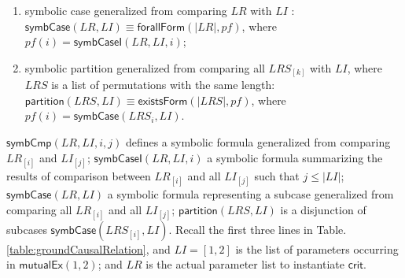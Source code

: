 \documentclass[final]{IEEEtran}
\def \iInv {iInv}
\def \iR {iR}
\begin{document}
{\begin{definition}
\begin{enumerate}
\item symbolic case  generalized from comparing $LR$ with $LI$ : $\mathsf{symbCase}(LR,LI )\equiv \mathsf{forallForm}(|LR|,pf)$, where $pf(i)= \mathsf{symbCaseI}(LR,LI,i )$;

\item symbolic partition generalized from comparing all $LRS_{[k]}$ with $LI$, where $LRS$ is a list of permutations with the same length: $\mathsf{partition}(LRS,LI) \equiv \mathsf{existsForm}(|LRS|,pf)$,  where $pf(i)= \mathsf{symbCase}(LRS_i,LI)$.

\end{enumerate}
\end{definition}

$\mathsf{symbCmp}(LR,LI,i,j)$ defines a symbolic formula  generalized from comparing $LR_{[i]}$ and $LI_{[j]}$; $\mathsf{symbCaseI}(LR,LI,i)$  a symbolic formula summarizing the results of comparison  between $LR_{[i]}$  and all $LI_{[j]}$ such that $j \le |LI|$; $\mathsf{symbCase}(LR,LI )$ a symbolic formula representing a subcase generalized from comparing all $LR_{[i]}$  and all $LI_{[j]}$; $\mathsf{partition}(LRS,LI)$  is a disjunction of subcases $\mathsf{symbCase}(LRS_{[i]},LI )$.  Recall the first three lines in Table. \ref{table:groundCausalRelation}, and $LI=[1,2]$ is the list of parameters occurring in $\mathsf{mutualEx}(1,2)$; and $LR$ is the actual parameter list to instantiate $\mathsf{crit}$.


\begin{itemize}


\end{itemize}}
\end{document}
